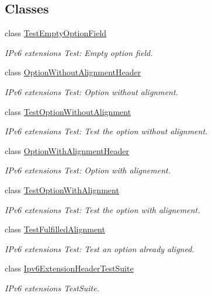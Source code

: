 \subsection*{Classes}
\begin{DoxyCompactItemize}
\item 
class \hyperlink{classTestEmptyOptionField}{Test\+Empty\+Option\+Field}
\begin{DoxyCompactList}\small\item\em I\+Pv6 extensions Test\+: Empty option field. \end{DoxyCompactList}\item 
class \hyperlink{classOptionWithoutAlignmentHeader}{Option\+Without\+Alignment\+Header}
\begin{DoxyCompactList}\small\item\em I\+Pv6 extensions Test\+: Option without alignment. \end{DoxyCompactList}\item 
class \hyperlink{classTestOptionWithoutAlignment}{Test\+Option\+Without\+Alignment}
\begin{DoxyCompactList}\small\item\em I\+Pv6 extensions Test\+: Test the option without alignment. \end{DoxyCompactList}\item 
class \hyperlink{classOptionWithAlignmentHeader}{Option\+With\+Alignment\+Header}
\begin{DoxyCompactList}\small\item\em I\+Pv6 extensions Test\+: Option with alignement. \end{DoxyCompactList}\item 
class \hyperlink{classTestOptionWithAlignment}{Test\+Option\+With\+Alignment}
\begin{DoxyCompactList}\small\item\em I\+Pv6 extensions Test\+: Test the option with alignement. \end{DoxyCompactList}\item 
class \hyperlink{classTestFulfilledAlignment}{Test\+Fulfilled\+Alignment}
\begin{DoxyCompactList}\small\item\em I\+Pv6 extensions Test\+: Test an option already aligned. \end{DoxyCompactList}\item 
class \hyperlink{classIpv6ExtensionHeaderTestSuite}{Ipv6\+Extension\+Header\+Test\+Suite}
\begin{DoxyCompactList}\small\item\em I\+Pv6 extensions Test\+Suite. \end{DoxyCompactList}\end{DoxyCompactItemize}
